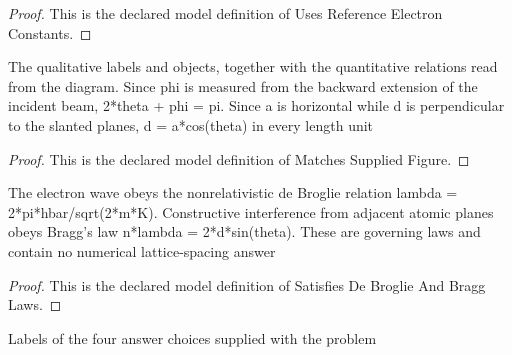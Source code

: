 \begin{proof}
  This is the declared model definition of Uses Reference Electron Constants.
\end{proof}
\begin{definition}
  \label{def:physics:phyx-mini-0532:phyxminiproblems-problemphyxmini0532-matchessuppliedfigure}
  The qualitative labels and objects, together with the quantitative relations read from the diagram. Since phi is measured from the backward extension of the incident beam, 2*theta + phi = pi. Since a is horizontal while d is perpendicular to the slanted planes, d = a*cos(theta) in every length unit
\end{definition}
\begin{proof}
  This is the declared model definition of Matches Supplied Figure.
\end{proof}
\begin{definition}
  \label{def:physics:phyx-mini-0532:phyxminiproblems-problemphyxmini0532-satisfiesdebroglieandbragglaws}
  The electron wave obeys the nonrelativistic de Broglie relation lambda = 2*pi*hbar/sqrt(2*m*K). Constructive interference from adjacent atomic planes obeys Bragg's law n*lambda = 2*d*sin(theta). These are governing laws and contain no numerical lattice-spacing answer
\end{definition}
\begin{proof}
  This is the declared model definition of Satisfies De Broglie And Bragg Laws.
\end{proof}
\begin{definition}
  \label{def:physics:phyx-mini-0532:phyxminiproblems-problemphyxmini0532-answerchoice}
  Labels of the four answer choices supplied with the problem
\end{definition}
